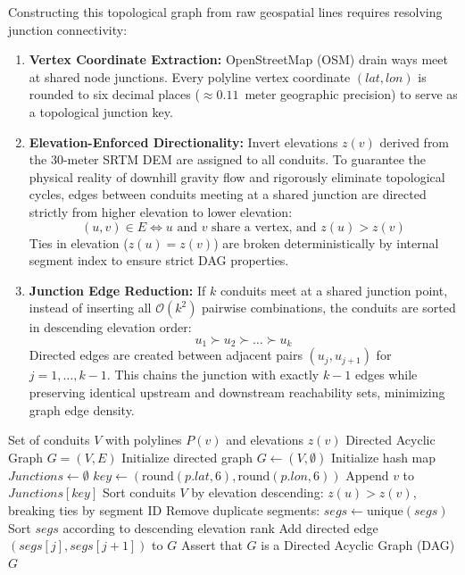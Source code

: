 Constructing this topological graph from raw geospatial lines requires resolving junction connectivity:
\begin{enumerate}
    \item \textbf{Vertex Coordinate Extraction:} OpenStreetMap (OSM) drain ways meet at shared node junctions. Every polyline vertex coordinate $(lat, lon)$ is rounded to six decimal places ($\approx 0.11$~meter geographic precision) to serve as a topological junction key.
    \item \textbf{Elevation-Enforced Directionality:} Invert elevations $z(v)$ derived from the 30-meter SRTM DEM are assigned to all conduits. To guarantee the physical reality of downhill gravity flow and rigorously eliminate topological cycles, edges between conduits meeting at a shared junction are directed strictly from higher elevation to lower elevation:
    \begin{equation}
    (u, v) \in E \iff u \text{ and } v \text{ share a vertex, and } z(u) > z(v)
    \end{equation}
    Ties in elevation ($z(u) = z(v)$) are broken deterministically by internal segment index to ensure strict DAG properties.
    \item \textbf{Junction Edge Reduction:} If $k$ conduits meet at a shared junction point, instead of inserting all $\mathcal{O}(k^2)$ pairwise combinations, the conduits are sorted in descending elevation order:
    \begin{equation}
    u_1 \succ u_2 \succ \dots \succ u_k
    \end{equation}
    Directed edges are created between adjacent pairs $(u_j, u_{j+1})$ for $j = 1, \dots, k-1$. This chains the junction with exactly $k-1$ edges while preserving identical upstream and downstream reachability sets, minimizing graph edge density.
\end{enumerate}

\begin{algorithm}[h!]
\caption{Elevation-Enforced Drainage DAG Construction}
\label{alg:dag_construction}
\begin{algorithmic}[1]
\REQUIRE Set of conduits $V$ with polylines $P(v)$ and elevations $z(v)$
\ENSURE Directed Acyclic Graph $G = (V, E)$
\STATE Initialize directed graph $G \leftarrow (V, \emptyset)$
\STATE Initialize hash map $Junctions \leftarrow \emptyset$ 
        \STATE $key \leftarrow (\text{round}(p.lat, 6), \text{round}(p.lon, 6))$
        \STATE Append $v$ to $Junctions[key]$
    \ENDFOR
\ENDFOR
\STATE Sort conduits $V$ by elevation descending: $z(u) > z(v)$, breaking ties by segment ID
    \STATE Remove duplicate segments: $segs \leftarrow \text{unique}(segs)$
        \STATE Sort $segs$ according to descending elevation rank
            \STATE Add directed edge $(segs[j], segs[j+1])$ to $G$
        \ENDFOR
    \ENDIF
\ENDFOR
\STATE Assert that $G$ is a Directed Acyclic Graph (DAG)
\RETURN $G$
\end{algorithmic}
\end{algorithm}


